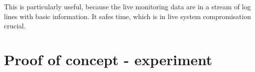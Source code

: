 This is particularly useful, because the live monitoring data are in a stream of log lines with basic information. It safes time, which is in live system compromisation crucial.

\section{Proof of concept - experiment \label{implementation:poc}}
